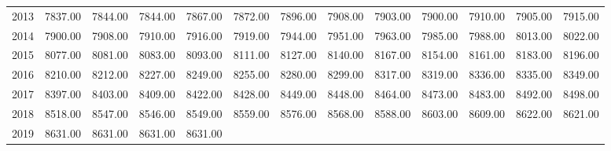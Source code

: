 \begin{longtable}{rrrrrrrrrrrrr}
  2013 & 7837.00 & 7844.00 & 7844.00 & 7867.00 & 7872.00 & 7896.00 & 7908.00 & 7903.00 & 7900.00 & 7910.00 & 7905.00 & 7915.00 \\ 
  2014 & 7900.00 & 7908.00 & 7910.00 & 7916.00 & 7919.00 & 7944.00 & 7951.00 & 7963.00 & 7985.00 & 7988.00 & 8013.00 & 8022.00 \\ 
  2015 & 8077.00 & 8081.00 & 8083.00 & 8093.00 & 8111.00 & 8127.00 & 8140.00 & 8167.00 & 8154.00 & 8161.00 & 8183.00 & 8196.00 \\ 
  2016 & 8210.00 & 8212.00 & 8227.00 & 8249.00 & 8255.00 & 8280.00 & 8299.00 & 8317.00 & 8319.00 & 8336.00 & 8335.00 & 8349.00 \\ 
  2017 & 8397.00 & 8403.00 & 8409.00 & 8422.00 & 8428.00 & 8449.00 & 8448.00 & 8464.00 & 8473.00 & 8483.00 & 8492.00 & 8498.00 \\ 
  2018 & 8518.00 & 8547.00 & 8546.00 & 8549.00 & 8559.00 & 8576.00 & 8568.00 & 8588.00 & 8603.00 & 8609.00 & 8622.00 & 8621.00 \\ 
  2019 & 8631.00 & 8631.00 & 8631.00 & 8631.00 &  &  &  &  &  &  &  &  \\ 
   \hline
\hline
\end{longtable}

